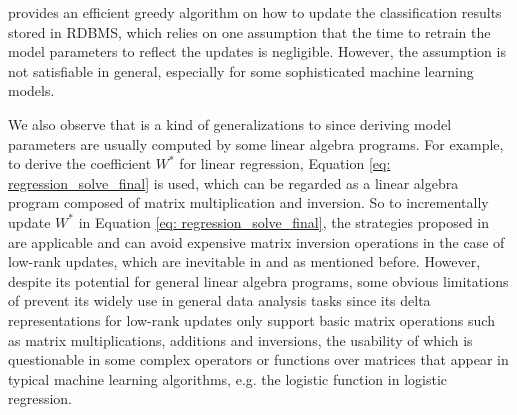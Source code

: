 \cite{koc2011incrementally} provides an efficient greedy algorithm on how to update the classification results stored in RDBMS, which relies on one assumption that the time to retrain the model parameters to reflect the updates is negligible. However, the assumption is not satisfiable in general, especially for some sophisticated machine learning models. 


We also observe that \cite{nikolic2014linview} is a kind of generalizations to \cite{deshpande2006mauvedb, gupta2015processing} since deriving model parameters are usually computed by some linear algebra programs. For example, to derive the coefficient $W^*$ for linear regression, Equation \ref{eq: regression_solve_final} is used, which can be regarded as a linear algebra program composed of matrix multiplication and inversion. So to incrementally update $W^*$ in Equation \ref{eq: regression_solve_final}, the strategies proposed in \cite{nikolic2014linview} are applicable and can avoid expensive matrix inversion operations in the case of low-rank updates, which are inevitable in \cite{deshpande2006mauvedb} and \cite{gupta2015processing} as mentioned before. However, despite its potential for general linear algebra programs, some obvious limitations of \cite{nikolic2014linview} prevent its widely use in general data analysis tasks since its delta representations for low-rank updates only support basic matrix operations such as matrix multiplications, additions and inversions, the usability of which is questionable in some complex operators or functions over matrices that appear in typical machine learning algorithms, e.g. the logistic function in logistic regression.